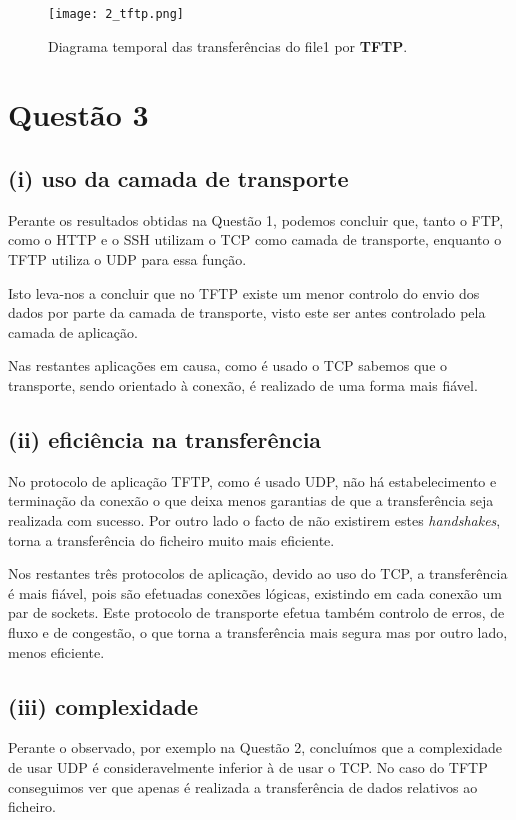 \documentclass{llncs}
\begin{document}
\begin{figure}[H]
\begin{center}
\texttt{[image: 2\_tftp.png]}
\end{center}
\caption{\label{fig:ssh}Diagrama temporal das transferências do file1 por \textbf{TFTP}.}
\end{figure}

\section{Questão 3}
\subsection{(i) uso da camada de transporte}
Perante os resultados obtidas na Questão 1, podemos concluir que, tanto o FTP, como o HTTP e o SSH utilizam o TCP como camada de transporte, enquanto o TFTP utiliza o UDP para essa função.

Isto leva-nos a concluir que no TFTP existe um menor controlo do envio dos dados por parte da camada de transporte, visto este ser antes controlado pela camada de aplicação.

Nas restantes aplicações em causa, como é usado o TCP sabemos que o transporte, sendo orientado à conexão, é realizado de uma forma mais fiável.

\subsection{(ii) eficiência na transferência}
No protocolo de aplicação TFTP, como é usado UDP, não há estabelecimento e terminação da conexão o que deixa menos garantias de que a transferência seja realizada com sucesso. Por outro lado o facto de não existirem estes \emph{handshakes}, torna a transferência do ficheiro muito mais eficiente.

Nos restantes três protocolos de aplicação, devido ao uso do TCP, a transferência é mais fiável, pois são efetuadas conexões lógicas, existindo em cada conexão um par de sockets. Este protocolo de transporte efetua também controlo de erros, de fluxo e de congestão, o que torna a transferência mais segura mas por outro lado, menos eficiente.

\subsection{(iii) complexidade}
Perante o observado, por exemplo na Questão 2, concluímos que a complexidade de usar UDP é consideravelmente inferior à de usar o TCP. No caso do TFTP conseguimos ver que apenas é realizada a transferência de dados relativos ao ficheiro.
\end{document}

